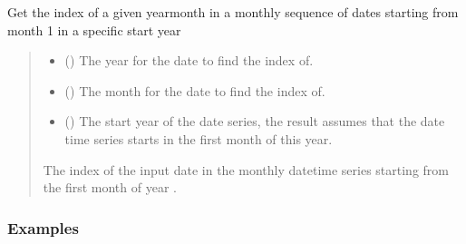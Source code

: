 \documentclass[letterpaper,10pt,english]{sphinxmanual}
\begin{document}
\begin{fulllineitems}
\label{\detokenize{misc:glomar_gridding.utils.get_date_index}}
\pysigstartsignatures
\pysiglinewithargsret
{}
{\sphinxparamcomma {}\sphinxparamcomma {}}
{}
\pysigstopsignatures
\sphinxAtStartPar
Get the index of a given year\sphinxhyphen{}month in a monthly sequence of dates
starting from month 1 in a specific start year
\begin{quote}\begin{description}
\begin{itemize}
\item {}
\sphinxAtStartPar
{} () \textendash{} The year for the date to find the index of.

\item {}
\sphinxAtStartPar
{} () \textendash{} The month for the date to find the index of.

\item {}
\sphinxAtStartPar
{} () \textendash{} The start year of the date series, the result assumes that the date
time series starts in the first month of this year.

\end{itemize}

\sphinxAtStartPar
{} \textendash{} The index of the input date in the monthly datetime series starting from
the first month of year .

\sphinxAtStartPar
{}

\end{description}\end{quote}
\subsubsection*{Examples}

\begin{sphinxVerbatim}[commandchars=\\\{\}]
  
\end{sphinxVerbatim}

\end{fulllineitems}
\end{document}
